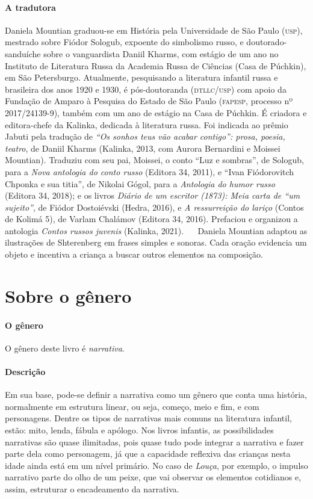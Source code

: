 \documentclass[11pt]{extarticle}
\begin{document}
\paragraph{A tradutora} 
Daniela Mountian graduou-se em História pela Universidade de São Paulo (\textsc{usp}), mestrado sobre Fiódor Sologub, expoente do simbolismo russo, e doutorado-sanduíche sobre o vanguardista Daniil Kharms, com estágio de um ano no Instituto de Literatura Russa da Academia Russa de Ciências (Casa de Púchkin), em São Petersburgo. Atualmente, pesquisando a literatura infantil russa e brasileira dos anos 1920 e 1930, é pós-doutoranda (\textsc{dtllc/usp}) com apoio da Fundação de Amparo à Pesquisa do Estado de São Paulo (\textsc{fapesp}, processo nº 2017/24139-9), também com um ano de estágio na Casa de Púchkin. É criadora e editora-chefe da Kalinka, dedicada à literatura russa. Foi indicada ao prêmio Jabuti pela tradução de \textit{“Os sonhos teus vão acabar contigo”: prosa, poesia, teatro}, de Daniil Kharms (Kalinka, 2013, com Aurora Bernardini e Moissei Mountian). Traduziu com seu pai, Moissei, o conto “Luz e sombras”, de Sologub, para a \textit{Nova antologia do conto russo} (Editora 34, 2011), e “Ivan Fiódorovitch Chponka e sua titia”, de Nikolai Gógol, para a \textit{Antologia do humor russo} (Editora 34, 2018); e os livros \textit{Diário de um escritor (1873): Meia carta de “um sujeito”}, de Fiódor Dostoiévski (Hedra, 2016), e \textit{A ressurreição do lariço} (Contos de Kolimá 5), de Varlam Chalámov (Editora 34, 2016). Prefaciou e organizou a antologia \textit{Contos russos juvenis} (Kalinka, 2021).
 
Daniela Mountian adaptou as ilustrações de Shterenberg em frases simples e sonoras. Cada oração evidencia um objeto e incentiva a criança a buscar outros elementos na composição.

\section{Sobre o gênero}

\paragraph{O gênero} O gênero deste livro é \textit{narrativa}. 


\paragraph{Descrição} Em sua base, pode-se definir a narrativa como um gênero que conta uma história, normalmente em estrutura linear, ou seja, começo, meio e fim, e com personagens. 
Dentre os tipos de narrativas mais comuns na literatura infantil, estão: mito, lenda, 
fábula e apólogo. Nos livros infantis, as possibilidades narrativas são quase ilimitadas, pois quase tudo pode integrar a narrativa e fazer parte dela como personagem, já que a capacidade reflexiva das crianças nesta idade ainda está em um nível primário. No caso de \textit{Louça}, por exemplo, o impulso narrativo parte do olho de um peixe, que vai observar os elementos cotidianos e, assim, estruturar o encadeamento da narrativa.
\end{document}
